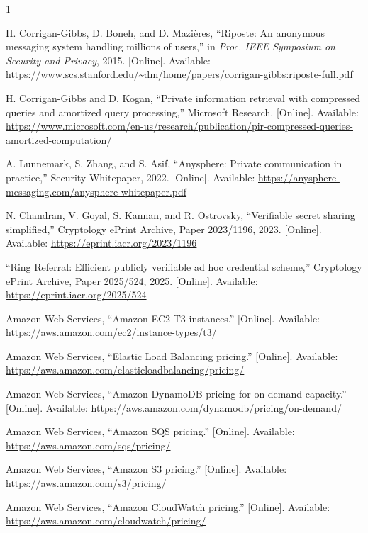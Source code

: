\documentclass[conference]{IEEEtran}
\begin{document}
\begin{thebibliography}{1}

H. Corrigan-Gibbs, D. Boneh, and D. Mazi\`eres, ``Riposte: An anonymous messaging system handling millions of users,'' in \emph{Proc. IEEE Symposium on Security and Privacy}, 2015. [Online]. Available: \url{https://www.scs.stanford.edu/~dm/home/papers/corrigan-gibbs:riposte-full.pdf}

H. Corrigan-Gibbs and D. Kogan, ``Private information retrieval with compressed queries and amortized query processing,'' Microsoft Research. [Online]. Available: \url{https://www.microsoft.com/en-us/research/publication/pir-compressed-queries-amortized-computation/}

A. Lunnemark, S. Zhang, and S. Asif, ``Anysphere: Private communication in practice,'' Security Whitepaper, 2022. [Online]. Available: \url{https://anysphere-messaging.com/anysphere-whitepaper.pdf}

N. Chandran, V. Goyal, S. Kannan, and R. Ostrovsky, ``Verifiable secret sharing simplified,'' Cryptology ePrint Archive, Paper 2023/1196, 2023. [Online]. Available: \url{https://eprint.iacr.org/2023/1196}

``Ring Referral: Efficient publicly verifiable ad hoc credential scheme,'' Cryptology ePrint Archive, Paper 2025/524, 2025. [Online]. Available: \url{https://eprint.iacr.org/2025/524}

Amazon Web Services, ``Amazon EC2 T3 instances.'' [Online]. Available: \url{https://aws.amazon.com/ec2/instance-types/t3/}

Amazon Web Services, ``Elastic Load Balancing pricing.'' [Online]. Available: \url{https://aws.amazon.com/elasticloadbalancing/pricing/}

Amazon Web Services, ``Amazon DynamoDB pricing for on-demand capacity.'' [Online]. Available: \url{https://aws.amazon.com/dynamodb/pricing/on-demand/}

Amazon Web Services, ``Amazon SQS pricing.'' [Online]. Available: \url{https://aws.amazon.com/sqs/pricing/}

Amazon Web Services, ``Amazon S3 pricing.'' [Online]. Available: \url{https://aws.amazon.com/s3/pricing/}

Amazon Web Services, ``Amazon CloudWatch pricing.'' [Online]. Available: \url{https://aws.amazon.com/cloudwatch/pricing/}

\end{thebibliography}
\end{document}
